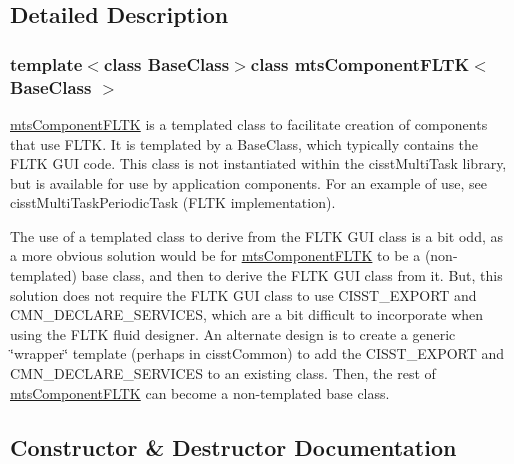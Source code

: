 \subsection{Detailed Description}
\subsubsection*{template$<$class Base\+Class$>$class mts\+Component\+F\+L\+T\+K$<$ Base\+Class $>$}

\hyperlink{classmts_component_f_l_t_k}{mts\+Component\+F\+L\+T\+K} is a templated class to facilitate creation of components that use F\+L\+T\+K. It is templated by a Base\+Class, which typically contains the F\+L\+T\+K G\+U\+I code. This class is not instantiated within the cisst\+Multi\+Task library, but is available for use by application components. For an example of use, see cisst\+Multi\+Task\+Periodic\+Task (F\+L\+T\+K implementation).

The use of a templated class to derive from the F\+L\+T\+K G\+U\+I class is a bit odd, as a more obvious solution would be for \hyperlink{classmts_component_f_l_t_k}{mts\+Component\+F\+L\+T\+K} to be a (non-\/templated) base class, and then to derive the F\+L\+T\+K G\+U\+I class from it. But, this solution does not require the F\+L\+T\+K G\+U\+I class to use C\+I\+S\+S\+T\+\_\+\+E\+X\+P\+O\+R\+T and C\+M\+N\+\_\+\+D\+E\+C\+L\+A\+R\+E\+\_\+\+S\+E\+R\+V\+I\+C\+E\+S, which are a bit difficult to incorporate when using the F\+L\+T\+K fluid designer. An alternate design is to create a generic \char`\"{}wrapper\char`\"{} template (perhaps in cisst\+Common) to add the C\+I\+S\+S\+T\+\_\+\+E\+X\+P\+O\+R\+T and C\+M\+N\+\_\+\+D\+E\+C\+L\+A\+R\+E\+\_\+\+S\+E\+R\+V\+I\+C\+E\+S to an existing class. Then, the rest of \hyperlink{classmts_component_f_l_t_k}{mts\+Component\+F\+L\+T\+K} can become a non-\/templated base class. 

\subsection{Constructor \& Destructor Documentation}
\hypertarget{classmts_component_f_l_t_k_a704219af0408a6490f6dd037dc875610}{}
